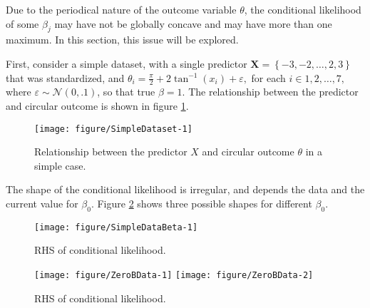 \documentclass[12pt,a4paper]{article}\usepackage[]{graphicx}\usepackage[]{color}
\makeatletter
\def\maxwidth{ %
  \ifdim\Gin@nat@width>\linewidth
    \linewidth
  \else
    \Gin@nat@width
  \fi
}
\newenvironment{knitrout}{}{} %
\makeatother
\begin{document}
Due to the periodical nature of the outcome variable $\theta$, the conditional likelihood of some $\beta_j$ may have not be globally concave and may have more than one maximum. In this section, this issue will be explored.

First, consider a simple dataset, with a single predictor $\boldsymbol{X} = \left\lbrace -3, -2, \dots, 2, 3 \right\rbrace $ that was standardized, and $\theta_i = \frac{\pi}{2} + 2 \tan^{-1} (x_i) + \varepsilon,$ for each $ i \in 1, 2, \dots, 7,$ where $\varepsilon \sim \mathcal{N}(0, .1)$, so that true $\beta = 1$. The relationship between the predictor and circular outcome is shown in figure \ref{SimpleDataset}.

\begin{figure}
\label{SimpleDataset}
\begin{knitrout}
\color{fgcolor}

{\centering \texttt{[image: figure/SimpleDataset-1]} 

}



\end{knitrout}
\caption{Relationship between the predictor $X$ and circular outcome $\theta$ in a simple case.}
\end{figure}

The shape of the conditional likelihood is irregular, and depends the data and the current value for $\beta_0$. Figure \ref{SimpleDataBeta} shows three possible shapes for different $\beta_0$.

\begin{figure}
\label{SimpleDataBeta}
\begin{knitrout}
\color{fgcolor}

{\centering \texttt{[image: figure/SimpleDataBeta-1]} 

}



\end{knitrout}
\caption{RHS of conditional likelihood.}
\end{figure}





\begin{figure}
\label{ZeroBData}
\begin{knitrout}
\color{fgcolor}

{\centering \texttt{[image: figure/ZeroBData-1]} 
\texttt{[image: figure/ZeroBData-2]} 

}



\end{knitrout}
\caption{RHS of conditional likelihood.}
\end{figure}
\end{document}
